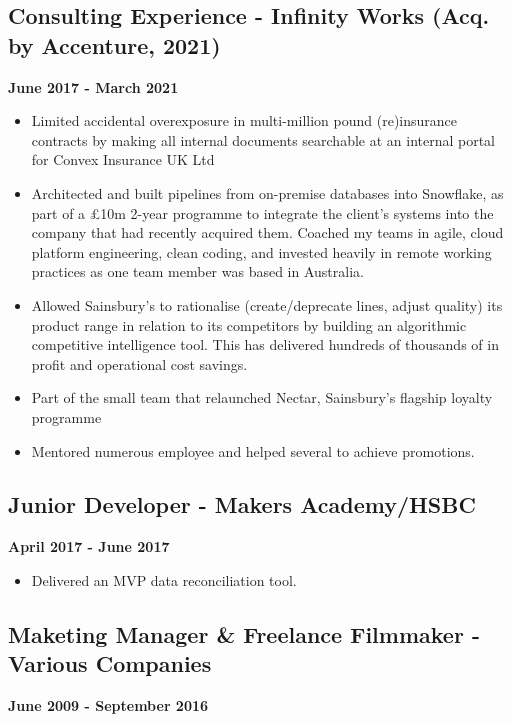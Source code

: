 \documentclass[a4paper]{scrartcl}
\begin{document}
\subsection*{Consulting Experience - Infinity Works (Acq. by Accenture, 2021)}
\textbf{June 2017 - March 2021}
\begin{itemize}
      \item Limited accidental overexposure in multi-million pound
            (re)insurance contracts by making
            all internal documents searchable at an internal portal for Convex
            Insurance UK Ltd
      \item Architected and built pipelines from on-premise databases into
            Snowflake, as part of a £10m 2-year programme to integrate the
            client's systems into the company that had recently acquired them.
            Coached my teams in agile, cloud platform engineering, clean
            coding,
            and invested heavily in remote working practices as one team member
            was based
            in Australia.
      \item Allowed Sainsbury's to rationalise (create/deprecate lines, adjust
            quality) its product range in relation to its competitors by
            building an
            algorithmic competitive intelligence tool. This has delivered
            hundreds of
            thousands of in profit and operational cost savings.
      \item Part of the small team that relaunched Nectar, Sainsbury's flagship
            loyalty programme
      \item Mentored numerous employee and helped several to achieve
            promotions.
\end{itemize}

\subsection*{Junior Developer - Makers Academy/HSBC}
\textbf{April 2017 - June 2017}
\begin{itemize}
      \item Delivered an MVP data reconciliation tool.
\end{itemize}

\subsection*{Maketing Manager \& Freelance Filmmaker - Various Companies}
\textbf{June 2009 - September 2016}
\end{document}
